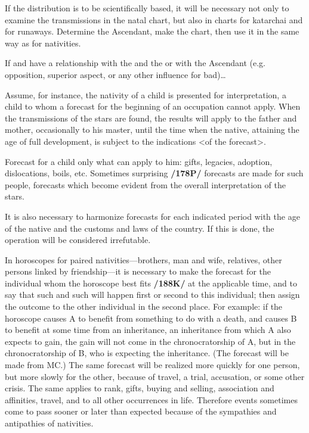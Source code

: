 If the distribution is to be scientifically based, it will be necessary not only to examine the transmissions in the natal chart, but also in charts for katarchai and for runaways. 
Determine the Ascendant, make the chart, then use it in the same way as for nativities.

If \Saturn\xspace and \Mars\xspace have a relationship with the \Sun\xspace and the \Moon\xspace or with the Ascendant (e.g.
opposition, superior aspect, or any other influence for bad)\ldots

Assume, for instance, the nativity of a child is presented for interpretation, a child to whom a forecast for the beginning of an occupation cannot apply. When the transmissions of the stars are found, the results will apply to the father and mother, occasionally to his master, until the time when the native, attaining the age of full development, is subject to the indications <of the forecast>. 

Forecast for a child only what can apply to him: gifts, legacies, adoption, dislocations, boils, etc. Sometimes surprising \textbf{/178P/} forecasts are made for such people, forecasts which become evident from the overall interpretation of the stars. 

It is also necessary to harmonize forecasts for each indicated period with the age of the native and the customs and laws of the country. If this is done, the operation will be considered irrefutable. 

In horoscopes for paired nativities—brothers, man and wife, relatives, other persons linked by friendship—it is necessary to make the forecast for the individual whom the horoscope best fits \textbf{/188K/} at the applicable time, and to say that such and such will happen first or second to this individual; then assign the outcome to the other individual in the second place. For example: if the horoscope causes A to benefit from something to do with a death, and causes B to benefit at some time from an inheritance, an inheritance from which A also expects to gain, the gain will not come in the chronocratorship of A, but in the chronocratorship of B, who is expecting the inheritance. (The forecast will be made from MC.) The
same forecast will be realized more quickly for one person, but more slowly for the other, because of travel, a trial, accusation, or some other crisis. The same applies to rank, gifts, buying and selling, association and affinities, travel, and to all other occurrences in life. Therefore events sometimes come to pass sooner or later than expected because of the sympathies and antipathies of nativities. 

